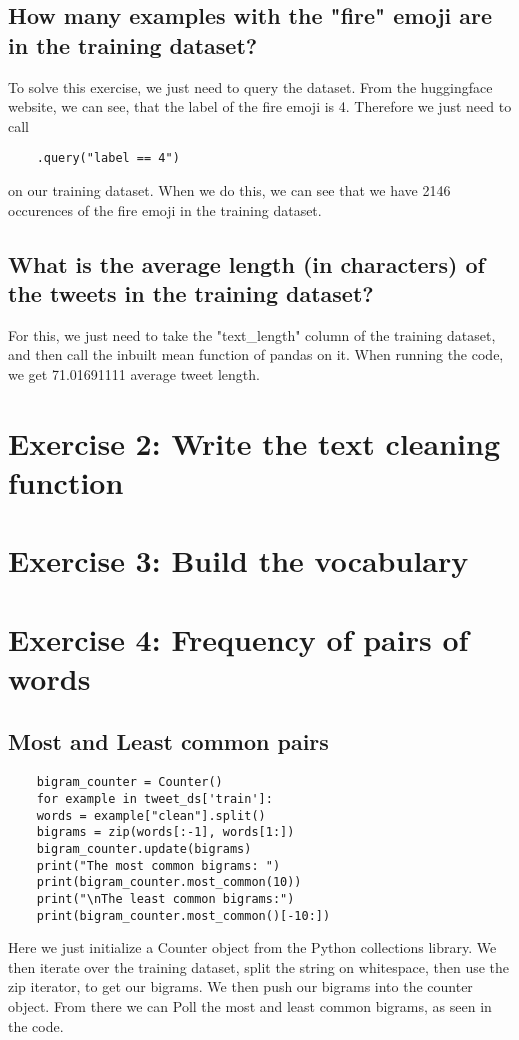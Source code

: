 \documentclass[11pt]{article}
\begin{document}
\subsection{How many examples with the "fire" emoji are in the training dataset?}
To solve this exercise, we just need to query the dataset. From the huggingface website, we can see, that the label of the fire emoji is 4. Therefore we just need to call
\begin{verbatim}
	.query("label == 4")
\end{verbatim}
on our training dataset. When we do this, we can see that we have 2146 occurences of the fire emoji in the training dataset.

\subsection{What is the average length (in characters) of the tweets in the training dataset?}
For this, we just need to take the "text\_length" column of the training dataset, and then call the inbuilt mean function of pandas on it. When running the code, we get 71.01691111 average tweet length.

\section{Exercise 2: Write the text cleaning function}

\section{Exercise 3: Build the vocabulary}

\section{Exercise 4: Frequency of pairs of words}
\subsection{Most and Least common pairs}
\begin{verbatim}
	bigram_counter = Counter()
	for example in tweet_ds['train']:
	words = example["clean"].split()
	bigrams = zip(words[:-1], words[1:])
	bigram_counter.update(bigrams)
	print("The most common bigrams: ")
	print(bigram_counter.most_common(10))
	print("\nThe least common bigrams:")
	print(bigram_counter.most_common()[-10:])
\end{verbatim}
Here we just initialize a Counter object from the Python collections library. We then iterate over the training dataset, split the string on whitespace, then use the zip iterator, to get our bigrams. We then push our bigrams into the counter object. From there we can Poll the  most and least common bigrams, as seen in the code. 
\end{document}

